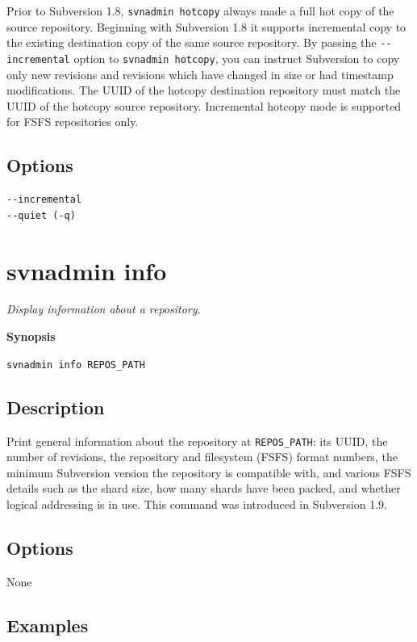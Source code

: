 Prior to Subversion 1.8, \texttt{svnadmin\ hotcopy} always made a full
hot copy of the source repository. Beginning with Subversion 1.8 it
supports incremental copy to the existing destination copy of the same
source repository. By passing the \texttt{-\/-incremental} option to
\texttt{svnadmin\ hotcopy}, you can instruct Subversion to copy only new
revisions and revisions which have changed in size or had timestamp
modifications. The UUID of the hotcopy destination repository must match
the UUID of the hotcopy source repository. Incremental hotcopy mode is
supported for FSFS repositories only.

\subsection{Options}

\begin{verbatim}
--incremental
--quiet (-q)
\end{verbatim}

\section{svnadmin info}\label{svn.ref.svnadmin.c.info}

\emph{Display information about a repository.}

\textbf{Synopsis}

\texttt{svnadmin\ info\ REPOS\_PATH}

\subsection{Description}

Print general information about the repository at \texttt{REPOS\_PATH}:
its UUID, the number of revisions, the repository and filesystem (FSFS)
format numbers, the minimum Subversion version the repository is
compatible with, and various FSFS details such as the shard size, how
many shards have been packed, and whether logical addressing is in use.
This command was introduced in Subversion 1.9.

\subsection{Options}

None

\subsection{Examples}

